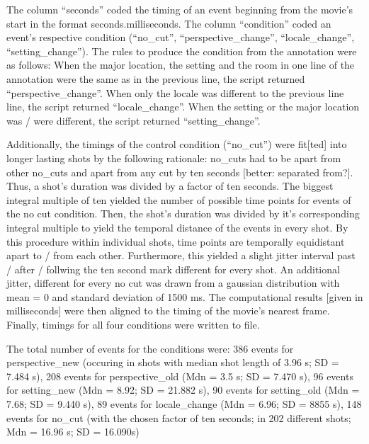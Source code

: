 \documentclass[10pt,a4paper,twocolumn]{article}
\begin{document}
The column ``seconds'' coded the timing of an event beginning from
the movie's start in the format seconds.milliseconds. The column ``condition''
coded an event's respective condition (``no\_cut'', ``perspective\_change'',
``locale\_change'', ``setting\_change''). The rules to produce
the condition from the annotation were as follows: When the major
location, the setting and the room in one line of the annotation were
the same as in the previous line, the script returned ``perspective\_change''.
When only the locale was different to the previous line line, the
script returned ``locale\_change''. When the setting or the major
location was / were different, the script returned ``setting\_change''. 

Additionally, the timings of the control condition (``no\_cut'')
were fit{[}ted{]} into longer lasting shots by the following rationale:
no\_cuts had to be apart from other no\_cuts and apart from any cut
by ten seconds {[}better: separated from?{]}. Thus, a shot's duration
was divided by a factor of ten seconds. The biggest integral multiple
of ten yielded the number of possible time points for events of the
no cut condition. Then, the shot's duration was divided by it's corresponding
integral multiple to yield the temporal distance of the events in
every shot. By this procedure within individual shots, time points
are temporally equidistant apart to / from each other. Furthermore,
this yielded a slight jitter interval past / after / follwing the
ten second mark different for every shot. An additional jitter, different
for every no cut was drawn from a gaussian distribution with mean
= 0 and standard deviation of 1500 ms. The computational results {[}given
in milliseconds{]} were then aligned to the timing of the movie's
nearest frame. Finally, timings for all four conditions were written
to file. 

The total number of events for the conditions were: 386 events for
perspective\_new (occuring in shots with median shot length of 3.96
s; SD = 7.484 s), 208 events for perspective\_old (Mdn = 3.5 s; SD
= 7.470 s), 96 events for setting\_new (Mdn = 8.92; SD = 21.882 s),
90 events for setting\_old (Mdn = 7.68; SD = 9.440 s), 89 events for
locale\_change (Mdn = 6.96; SD = 8855 s), 148 events for no\_cut (with
the chosen factor of ten seconds; in 202 different shots; Mdn = 16.96
s; SD = 16.090s)
\end{document}
